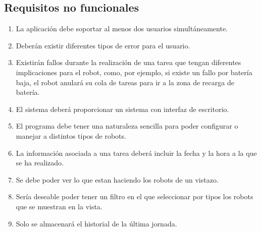 \subsection{Requisitos no funcionales}

\begin{enumerate}
  \item La aplicación debe soportar al menos dos usuarios simultáneamente.
  \item Deberán existir diferentes tipos de error para el usuario.
  \item Existirán fallos durante la realización de una tarea que tengan diferentes implicaciones para el robot, como, por ejemplo, si existe un fallo por batería baja, el robot anulará su cola de tareas para ir a la zona de recarga de batería.
  \item El sistema deberá proporcionar un sistema con interfaz de escritorio. 
  \item El programa debe tener una naturaleza sencilla para poder configurar o manejar a distintos tipos de robots.
  \item La información asociada a una tarea deberá incluir la fecha y la hora a la que se ha realizado.
  \item Se debe poder ver lo que estan haciendo los robots de un vistazo.
  \item Sería deseable poder tener un filtro en el que seleccionar por tipos los robots que se muestran en la vista.
  \item Solo se almacenará el historial de la última jornada.
\end{enumerate}